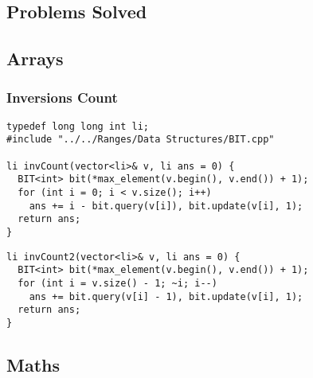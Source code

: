 \documentclass[twoside]{article}
\newcommand{\fileTitleStyle}{\large\underline}
\begin{document}
\egroup
\vspace{1em}
\begin{multicols*}{2}
\sectionfont{\centering\bfseries\Huge}
\vspace{1em}
\section*{Problems Solved}
\vspace{3em}
\subsectionfont{\centering\bfseries\LARGE}
\vspace{0em}
\subsection*{Arrays}
\vspace{2em}
\subsubsectionfont{\centering\bfseries\Large}
\subsubsectionfont{\fileTitleStyle}
\subsubsection*{Inversions Count}
\begin{verbatim}
typedef long long int li;
#include "../../Ranges/Data Structures/BIT.cpp"

li invCount(vector<li>& v, li ans = 0) {
  BIT<int> bit(*max_element(v.begin(), v.end()) + 1);
  for (int i = 0; i < v.size(); i++)
    ans += i - bit.query(v[i]), bit.update(v[i], 1);
  return ans;
}
\end{verbatim}
\vspace{-12pt}
\begin{verbatim}
li invCount2(vector<li>& v, li ans = 0) {
  BIT<int> bit(*max_element(v.begin(), v.end()) + 1);
  for (int i = v.size() - 1; ~i; i--)
    ans += bit.query(v[i] - 1), bit.update(v[i], 1);
  return ans;
}
\end{verbatim}

\subsectionfont{\centering\bfseries\LARGE}
\vspace{0em}
\subsection*{Maths}
\vspace{2em}
\subsubsectionfont{\centering\bfseries\Large}
\subsubsectionfont{\fileTitleStyle}

\end{multicols*}
\end{document}
